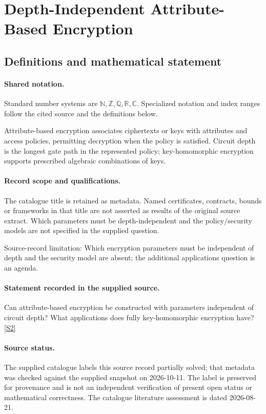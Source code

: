 \documentclass[11pt]{article}
\newcommand{\sref}[2]{\hyperlink{source:#1:#2}{[S#2]}}
\begin{document}
\section{Depth-Independent Attribute-Based Encryption}\label{statement}

\subsection{Definitions and mathematical statement}

\paragraph{Shared notation.}Standard number systems are $\mathbb N,\mathbb Z,\mathbb Q,\mathbb R,\mathbb C$. Specialized notation and index ranges follow the cited source and the definitions below.


Attribute-based encryption associates ciphertexts or keys with attributes and access policies, permitting decryption when the policy is satisfied. Circuit depth is the longest gate path in the represented policy; key-homomorphic encryption supports prescribed algebraic combinations of keys.
\paragraph{Record scope and qualifications.}
The catalogue title is retained as metadata. Named certificates, contracts, bounds or frameworks in that title are not asserted as results of the original source extract.
Which parameters must be depth-independent and the policy/security models are not specified in the supplied question.

Source-record limitation: Which encryption parameters must be independent of depth and the security model are absent; the additional applications question is an agenda.
\paragraph{Statement recorded in the supplied source.}
Can attribute-based encryption be constructed with parameters independent of circuit depth? What applications does fully key-homomorphic encryption have? \sref{statement}{2}
\paragraph{Source status.}
The supplied catalogue labels this source record partially solved; that metadata was checked against the supplied snapshot on 2026-10-11. The label is preserved for provenance and is not an independent verification of present open status or mathematical correctness. The catalogue literature assessment is dated 2026-08-21.
\end{document}

